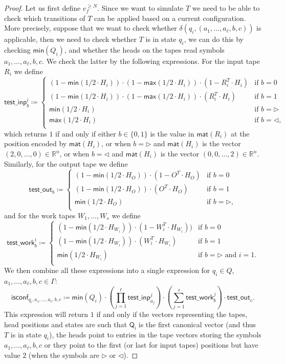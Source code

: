 \begin{proof}
Let us first define $e_f^{\geq N}$. Since we want to simulate $T$ we need to be able to check which 
transitions of $T$ can be applied based on a current configuration. More precisely,
suppose that we want to check whether $\delta(q_i,(a_1,\ldots,a_{\ell},b,c))$ is applicable, then we 
need to check whether $T$ is in state $q_i$, we can do this by checking 
$\mathsf{min}(Q_i)$, and whether the heads on the tapes read symbols $a_1,\ldots,a_{\ell},b,c$. We 
check the latter by the following expressions.
For the input tape $R_i$ we define
$$
\mathsf{test\_inp}^i_b\coloneqq \begin{cases}
(1-\mathsf{min}(1/2\cdot H_i))\cdot(1-\mathsf{max}(1/2\cdot H_i))\cdot(1- R_i^T\cdot H_i) & \text{if $b=0$}\\
(1-\mathsf{min}(1/2\cdot H_i))\cdot(1-\mathsf{max}(1/2\cdot H_i))\cdot(R_i^T\cdot H_i) & \text{if $b=1$}\\
\mathsf{min}(1/2\cdot H_i) & \text{if $b=\rhd$}\\
\mathsf{max}(1/2\cdot H_i) & \text{if $b=\lhd$},\\
\end{cases}
$$
which returns $1$ if and only if either $b\in\{0,1\}$ is the value in $\mathsf{mat}(R_i)$ at the 
position encoded by $\mathsf{mat}(H_i)$, or when $b=\rhd$ and $\mathsf{mat}(H_i)$ is the vector 
$(2,0,\ldots,0)\in\mathbb{R}^n$, or when $b=\lhd$ and $\mathsf{mat}(H_i)$ is the vector 
$(0,0,\ldots,2)\in\mathbb{R}^n$. Similarly, for the output tape we define
$$
\mathsf{test\_out}_b\coloneqq \begin{cases}
(1-\mathsf{min}(1/2\cdot H_O))\cdot(1- O^T\cdot H_O) & \text{if $b=0$}\\
(1-\mathsf{min}(1/2\cdot H_O))\cdot(O^T\cdot H_O) & \text{if $b=1$}\\
\mathsf{min}(1/2\cdot H_O) & \text{if $b=\rhd$},\\
\end{cases}
$$
and for the work tapes $W_1,\ldots,W_s$ we define
$$
\mathsf{test\_work}^i_b\coloneqq \begin{cases}
(1-\mathsf{min}(1/2\cdot H_{W_i}))\cdot(1- W_i^T\cdot H_{W_i})) & \text{if $b=0$}\\
(1-\mathsf{min}(1/2\cdot H_{W_i}))\cdot (W_i^T\cdot H_{W_i}) & \text{if $b=1$}\\
\mathsf{min}(1/2\cdot H_{W_i}) & \text{if $b=\rhd$ and $i=1$}.\\
\end{cases}
$$
We then combine all these expressions into a single expression for $q_i\in Q$, 
$a_1,\ldots,a_\ell,b,c\in\Gamma$:
$$
\mathsf{isconf}_{q_i,a_1,\ldots,a_\ell,b,c}\coloneqq 
\mathsf{min}(Q_i)\cdot \left(\prod_{j=1}^{\ell} \mathsf{test\_inp}_{a_j}^j\right)
\cdot\left(\sum_{j=1}^s \mathsf{test\_work}_b^j\right)\cdot \mathsf{test\_out}_{c}.
$$
This expression will return $1$ if and only if the vectors representing the tapes, 
head positions and states are such that $\mathsf{Q_i}$ is the first canonical vector 
(and thus $T$ is in state $q_i$), the heads point to entries in the tape vectors storing 
the symbols $a_1,\ldots,a_{\ell}, b,c$ or they point to the first (or last for input tapes) 
positions but have value $2$ (when the symbols are $\rhd$ or $\lhd$). 


\end{proof}
